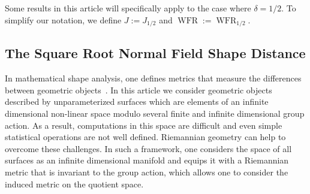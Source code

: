 \documentclass[final,hidelinks,onefignum,onetabnum]{siamart220329}
\newcommand{\WFR}{\operatorname{WFR}}
\begin{document}
\noindent Some results in this article will specifically apply to the case where $\delta=1/2$. To simplify our notation, we define $J:=J_{1/2}$ and $\WFR:=\WFR_{1/2}$.



\subsection{The Square Root Normal Field Shape Distance}
In mathematical shape analysis, one defines metrics that measure the differences between geometric objects~\cite{younes2010shapes,bauer2014overview,srivastava2016functional,dryden2016statistical}. In this article we consider geometric objects described by unparameterized surfaces which are elements of an infinite dimensional non-linear space modulo several finite and infinite dimensional group action. As a result, computations in this space are difficult and even simple statistical operations are not well defined.  Riemannian geometry can help to overcome these challenges. In such a framework, one considers the space of all surfaces as an infinite dimensional manifold and equips it with a Riemannian metric that is invariant to the group action, which allows one to consider the induced metric on the quotient space. 
\end{document}
